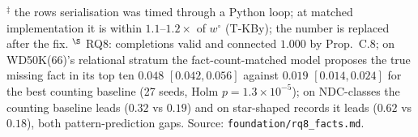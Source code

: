 \begin{table}[!t]
\begin{flushleft}
$^{\ddagger}$ the rows serialisation was timed through a Python loop; at matched implementation it is within $1.1$--$1.2\times$ of $w^{\circ}$ (T-KBy); the number is replaced after the fix.
$^{\S}$ RQ8: completions valid and connected $1.000$ by Prop.~C.8; on WD50K(66)'s relational stratum the fact-count-matched model proposes the true missing fact in its top ten $0.048$ $[0.042, 0.056]$ against $0.019$ $[0.014, 0.024]$ for the best counting baseline (27 seeds, Holm $p = 1.3\times10^{-5}$); on NDC-classes the counting baseline leads ($0.32$ vs $0.19$) and on star-shaped records it leads ($0.62$ vs $0.18$), both pattern-prediction gaps. Source: \texttt{foundation/rq8\_facts.md}.
\end{flushleft}
\end{table}
